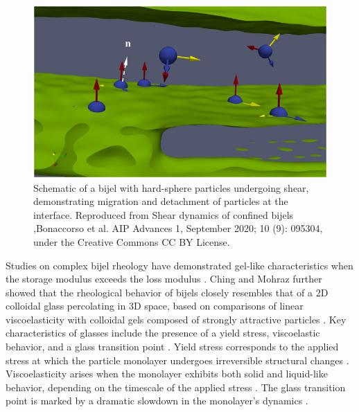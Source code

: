 \begin{figure}
    \centering
    \includegraphics[scale = 3]{figures/literature_review/bijel_under_shear.jpeg}
    \caption{Schematic of a bijel with hard-sphere particles undergoing shear, demonstrating migration and detachment of 
             particles at the interface. \cite{bonaccorso_shear_2020} Reproduced from Shear dynamics of confined bijels
             ,Bonaccorso et al. AIP Advances 1, September 2020; 10 (9): 095304, under the Creative Commons CC BY License.}
    \label{fig:bijel_under_shear}
\end{figure} 

Studies on complex bijel rheology have demonstrated gel-like characteristics when the storage modulus exceeds the loss modulus \cite{lee_making_2013, bai_dynamics_2015}. 
Ching and Mohraz further showed that the rheological behavior of bijels closely resembles that of a 2D colloidal glass percolating in 3D space, based on comparisons of 
linear viscoelasticity with colloidal gels composed of strongly attractive particles \cite{ching_bijel_2022}. Key characteristics of glasses include the presence of a 
yield stress, viscoelastic behavior, and a glass transition point \cite{pham_yielding_2008, weeks_introduction_2017}. Yield stress corresponds to the applied stress at 
which the particle monolayer undergoes irreversible structural changes \cite{pham_yielding_2008}. Viscoelasticity arises when the monolayer exhibits both solid and 
liquid-like behavior, depending on the timescale of the applied stress \cite{pham_yielding_2008}. The glass transition point is marked by a dramatic slowdown in the 
monolayer's dynamics \cite{weeks_introduction_2017}. 



